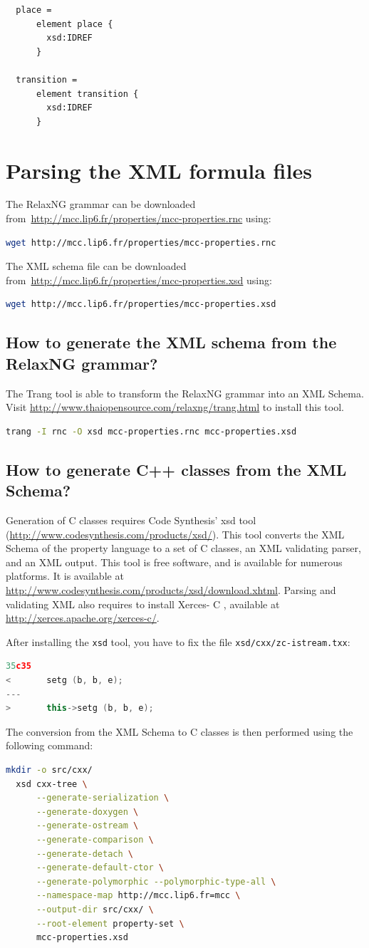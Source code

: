 \documentclass[10pt,english,a4paper]{article}
\newcommand{\CC}{%
  C\nolinebreak\hspace{-.05em}\raisebox{.4ex}{\scriptsize\bf +}\nolinebreak\hspace{-.10em}\raisebox{.4ex}{\scriptsize\bf +}%
}
\newcommand\mysection[1]{\color{sectioncolor}\section{#1}\color{defaultcolor}}
\newcommand\mysubsection[1]{\color{sectioncolor}\subsection{#1}\color{defaultcolor}}
\begin{document}
\begin{lstlisting}
  place =
      element place {
        xsd:IDREF
      }

  transition =
      element transition {
        xsd:IDREF
      }
\end{lstlisting}

\iffalse
\mysection{Parsing the XML formula files}
\label{s:parsing}

The RelaxNG grammar can be downloaded from~\url{http://mcc.lip6.fr/properties/mcc-properties.rnc} using:
\begin{lstlisting}[language=sh]
  wget http://mcc.lip6.fr/properties/mcc-properties.rnc
\end{lstlisting}

The XML schema file can be downloaded from~\url{http://mcc.lip6.fr/properties/mcc-properties.xsd} using:
\begin{lstlisting}[language=sh]
  wget http://mcc.lip6.fr/properties/mcc-properties.xsd
\end{lstlisting}

\mysubsection{How to generate the XML schema from the RelaxNG grammar?}
The Trang tool is able to transform the RelaxNG grammar into an XML Schema.
Visit \url{http://www.thaiopensource.com/relaxng/trang.html} to install this tool.

\begin{lstlisting}[language=sh]
  trang -I rnc -O xsd mcc-properties.rnc mcc-properties.xsd
\end{lstlisting}

\mysubsection{How to generate C++ classes from the XML Schema?}
Generation of {\CC} classes requires Code Synthesis' xsd tool
(\url{http://www.codesynthesis.com/products/xsd/}).
This tool converts the XML Schema of the property language to a set of \CC{} classes,
an XML validating parser, and an XML output.
This tool is free software, and is available for numerous platforms.
It is available at \url{http://www.codesynthesis.com/products/xsd/download.xhtml}.
Parsing and validating XML also requires to install Xerces-\CC{},
available at \url{http://xerces.apache.org/xerces-c/}.

After installing the \lstinline!xsd! tool,
you have to fix the file \lstinline!xsd/cxx/zc-istream.txx!:
\begin{lstlisting}[language=C++]
35c35
<       setg (b, b, e);
---
>       this->setg (b, b, e);
\end{lstlisting}

The conversion from the XML Schema to \CC{} classes is then performed using the following command:
\begin{lstlisting}[language=sh]
  mkdir -o src/cxx/
  xsd cxx-tree \
      --generate-serialization \
      --generate-doxygen \
      --generate-ostream \
      --generate-comparison \
      --generate-detach \
      --generate-default-ctor \
      --generate-polymorphic --polymorphic-type-all \
      --namespace-map http://mcc.lip6.fr=mcc \
      --output-dir src/cxx/ \
      --root-element property-set \
      mcc-properties.xsd
\end{lstlisting}
\end{document}
